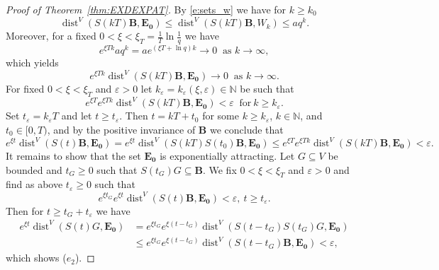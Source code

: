 \documentclass[a4paper,12pt,reqno]{amsart}
\theoremstyle{plain}
\theoremstyle{definition}
\numberwithin{equation}{section}
\newcommand{\N}{\mathbb{N}}
\newcommand{\eps}{\varepsilon}
\newcommand{\dist}{\operatorname{dist}}
\renewcommand{\geq}{\geqslant}
\renewcommand{\leq}{\leqslant}
\begin{document}
\begin{proof}[Proof of Theorem~\ref{thm:EXDEXPAT}]
By \eqref{e:sets_w} we have for $k\geq k_0$
$$\dist^{V}(S(kT)\mathbf{B},\mathbf{E_0})\leq\dist^{V}(S(kT)\mathbf{B},W_{k})\leq a q^{k}.$$
Moreover, for a fixed $0<\xi<\xi_T=\frac{1}{T}\ln{\frac{1}{q}}$ we have
$$e^{\xi Tk}a q^{k}=a e^{(\xi T+\ln{q})k}\to 0\ \text{ as }k\to\infty,$$
which yields
$$e^{\xi Tk}\dist^{V}(S(kT)\mathbf{B},\mathbf{E_0})\to 0\ \text{ as }k\to\infty.$$
For fixed $0<\xi<\xi_T$ and  $\eps>0$ let $k_\eps=k_{\eps}(\xi,\eps)\in\N$ be such that
$$e^{\xi T}e^{\xi T k}\dist^{V}(S(kT)\mathbf{B},\mathbf{E_0})<\eps\ \text{ for}\ k\geq k_\eps.$$
Set $t_\eps=k_\eps T$ and let $t\geq t_\eps$. Then $t=kT+t_0$ for some $k\geq k_\eps$, $k\in\N$,
and $t_0\in[0,T)$, and by the positive invariance of $\mathbf{B}$ we conclude that 
$$e^{\xi t}\dist^{V}(S(t)\mathbf{B},\mathbf{E_0})=e^{\xi t}\dist^{V}(S(kT)S(t_0)\mathbf{B},\mathbf{E_0})
\leq e^{\xi T}e^{\xi T k}\dist^{V}(S(kT)\mathbf{B},\mathbf{E_0})<\eps.$$
It remains to show that the set $\mathbf{E_0}$ is exponentially attracting.
Let $G\subseteq V$ be bounded and $t_{G}\geq 0$ such that
$S(t_G)G\subseteq \mathbf{B}$. We fix $0<\xi<\xi_T$ and $\eps>0$ and find as above $t_\eps\geq 0$ such that
$$e^{\xi t_{G}}e^{\xi t}\dist^{V}(S(t)\mathbf{B},\mathbf{E_0})<\eps,\ t\geq t_\eps.$$
Then for $t\geq t_{G}+t_\eps$ we have
\begin{align*}
e^{\xi t}\dist^{V}(S(t)G,\mathbf{E_0})&=e^{\xi t_{G}}e^{\xi (t-t_{G})}\dist^{V}(S(t-t_{G})S(t_{G})G,\mathbf{E_0})\\
&\leq e^{\xi t_{G}}e^{\xi(t-t_{G})}\dist^{V}(S(t-t_{G})\mathbf{B},\mathbf{E_0})<\eps,
\end{align*}
which shows ($e_2$).


\end{proof}
\end{document}
